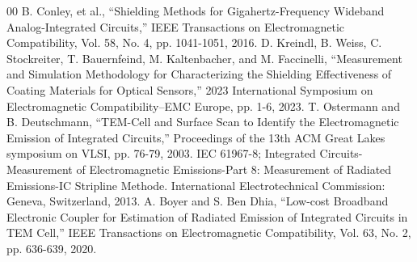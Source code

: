 \documentclass[conference]{IEEEtran}
\begin{document}
\begin{thebibliography}{00}
 B. Conley, et al., ``Shielding Methods for Gigahertz-Frequency Wideband Analog-Integrated Circuits,'' IEEE Transactions on Electromagnetic Compatibility, Vol. 58, No. 4, pp. 1041-1051, 2016.
 D. Kreindl, B. Weiss, C. Stockreiter, T. Bauernfeind, M. Kaltenbacher, and M. Faccinelli, ``Measurement and Simulation Methodology for Characterizing the Shielding Effectiveness of Coating Materials for Optical Sensors,'' 2023 International Symposium on Electromagnetic Compatibility–EMC Europe, pp. 1-6, 2023.
 T. Ostermann and B. Deutschmann, ``TEM-Cell and Surface Scan to Identify the Electromagnetic Emission of Integrated Circuits,'' Proceedings of the 13th ACM Great Lakes symposium on VLSI, pp. 76-79, 2003.
 IEC 61967-8; Integrated Circuits-Measurement of Electromagnetic Emissions-Part 8: Measurement of Radiated Emissions-IC Stripline Methode. International Electrotechnical Commission: Geneva, Switzerland, 2013.
 A. Boyer and S. Ben Dhia, ``Low-cost Broadband Electronic Coupler for Estimation of Radiated Emission of Integrated Circuits in TEM Cell,'' IEEE Transactions on Electromagnetic Compatibility, Vol. 63, No. 2, pp. 636-639, 2020.


\end{thebibliography}
\end{document}
